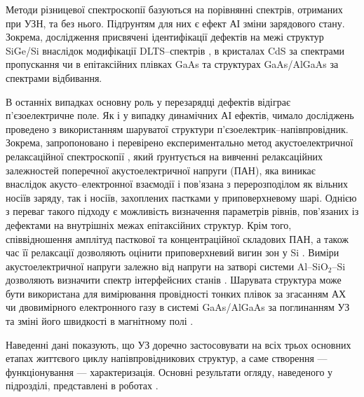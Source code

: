 Методи різницевої спектроскопії базуються на порівнянні спектрів, отриманих при УЗН, та без нього.
Підґрунтям для них є ефект АІ зміни зарядового стану.
Зокрема, дослідження присвячені ідентифікації дефектів на межі структур SiGe/Si внаслідок модифікації DLTS--спектрів \cite{KorotchFTP1996},
в кристалах CdS за спектрами пропускання \cite{KorotFTT93}
чи в епітаксійних плівках GaAs \cite{KorotFTP1994,OSTROVSKII2000,Ostrovskii2001} та
структурах GaAs/AlGaAs \cite{SST:USmethod} за спектрами відбивання.

В останніх випадках основну роль у перезарядці дефектів відіграє п'єзоелектричне поле.
Як і у випадку динамічних АІ ефектів, чимало досліджень проведено з використанням шаруватої структури п'єзоелектрик--напівпровідник.
Зокрема, запропоновано і перевірено експериментально метод акустоелектричної релаксаційної спектроскопії \cite{Saiko1993,OstrovPAN,OlikhSSC}, який ґрунтується на вивченні релаксаційних залежностей
поперечної акустоелектричної напруги (ПАН), яка виникає внаслідок акусто--електронної взаємодії і пов'язана з перерозподілом як вільних носіїв заряду, так і носіїв, захоплених пастками у приповерхневому шарі.
Однією з переваг такого підходу є можливість визначення параметрів рівнів, пов'язаних із дефектами на внутрішніх межах епітаксійних структур.
Крім того,
співвідношення амплітуд пасткової та концентраційної складових ПАН, а також час її релаксації дозволяють оцінити
приповерхневий вигин  зон у Si \cite{PANnew}.
Виміри акустоелектричної напруги залежно від напруги на затворі системи  Al--SiO$_2$--Si дозволяють визначити спектр інтерфейсних станів \cite{USM:Nss}.
Шарувата структура може бути використана для вимірювання провідності тонких плівок за згасанням АХ \cite{USM:provid} чи двовимірного електронного газу в системі  GaAs/AlGaAs за поглинанням УЗ та зміні його швидкості в магнітному полі \cite{PhysRevB83:235318}.












Наведенні дані показують, що УЗ доречно застосовувати на всіх трьох основних етапах життєвого циклу напівпровідникових структур,
а саме створення --- функціонування --- характеризація.
Основні результати огляду, наведеного у підрозділі, представлені в роботах \cite{Olikh:SEMT2004,Olikh:SEMT2011,1UNCPS,2013Buk}.




